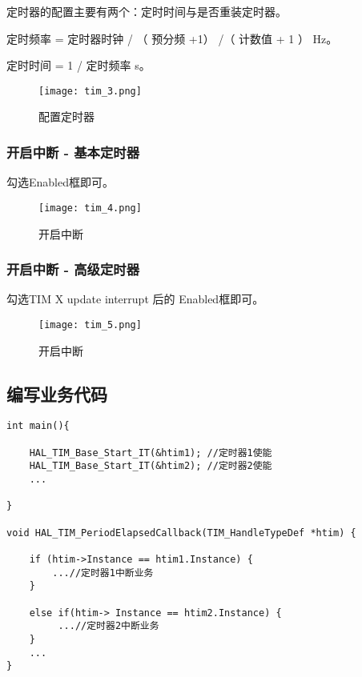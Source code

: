 \documentclass[cn,11pt]{elegantbook}
\begin{document}
定时器的配置主要有两个：定时时间与是否重装定时器。

定时频率 = 定时器时钟 / （ 预分频 +1） /（  计数值 + 1 ）  Hz。
  
定时时间 = 1 /  定时频率 s。

\begin{figure}[htbp]
	\centering
	\texttt{[image: tim\_3.png]}
	\caption{配置定时器 \label{fig:scatter}}
\end{figure}

\subsubsection{开启中断 - 基本定时器}

勾选Enabled框即可。

\begin{figure}[htbp]
	\centering
	\texttt{[image: tim\_4.png]}
	\caption{开启中断 \label{fig:scatter}}
\end{figure}

\newpage

\subsubsection{开启中断 - 高级定时器}

勾选TIM X update interrupt 后的 Enabled框即可。

\begin{figure}[htbp]
	\centering
	\texttt{[image: tim\_5.png]}
	\caption{开启中断 \label{fig:scatter}}
\end{figure}

\subsection{编写业务代码}

\lstset{language=C}
\begin{lstlisting}
int main(){

	HAL_TIM_Base_Start_IT(&htim1); //定时器1使能
	HAL_TIM_Base_Start_IT(&htim2); //定时器2使能
	...

}

void HAL_TIM_PeriodElapsedCallback(TIM_HandleTypeDef *htim) {

	if (htim->Instance == htim1.Instance) {
		...//定时器1中断业务
	}

	else if(htim-> Instance == htim2.Instance) {
		 ...//定时器2中断业务
	}
	...
}
\end{lstlisting}
\end{document}

